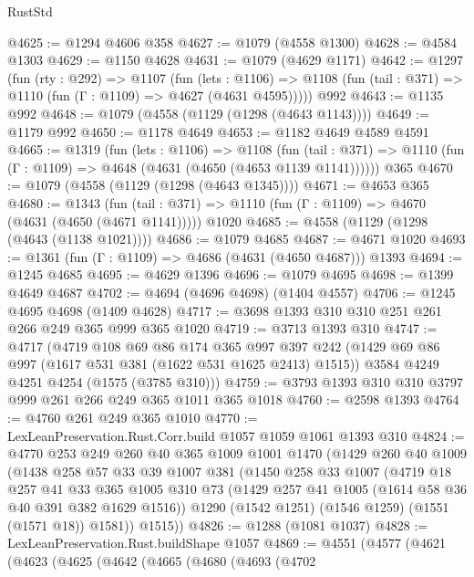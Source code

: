 \begin{lexlean}{RustStd}
\begin{coremodule}
@4625 := @1294 @4606 @358
@4627 := @1079 (@4558 @1300)
@4628 := @4584 @1303
@4629 := @1150 @4628
@4631 := @1079 (@4629 @1171)
@4642 := @1297
    (fun (rty : @292) =>
    @1107
      (fun (lets : @1106) =>
      @1108 (fun (tail : @371) => @1110 (fun (Γ : @1109) => @4627 (@4631 @4595)))))
    @992
@4643 := @1135 @992
@4648 := @1079 (@4558 (@1129 (@1298 (@4643 @1143))))
@4649 := @1179 @992
@4650 := @1178 @4649
@4653 := @1182 @4649 @4589 @4591
@4665 := @1319
    (fun (lets : @1106) =>
    @1108
      (fun (tail : @371) => @1110 (fun (Γ : @1109) => @4648 (@4631 (@4650 (@4653 @1139 @1141))))))
    @365
@4670 := @1079 (@4558 (@1129 (@1298 (@4643 @1345))))
@4671 := @4653 @365
@4680 := @1343
    (fun (tail : @371) => @1110 (fun (Γ : @1109) => @4670 (@4631 (@4650 (@4671 @1141)))))
    @1020
@4685 := @4558 (@1129 (@1298 (@4643 (@1138 @1021))))
@4686 := @1079 @4685
@4687 := @4671 @1020
@4693 := @1361 (fun (Γ : @1109) => @4686 (@4631 (@4650 @4687))) @1393
@4694 := @1245 @4685
@4695 := @4629 @1396
@4696 := @1079 @4695
@4698 := @1399 @4649 @4687
@4702 := @4694 (@4696 @4698) (@1404 @4557)
@4706 := @1245 @4695 @4698 (@1409 @4628)
@4717 := @3698 @1393 @310 @310 @251 @261 @266 @249 @365 @999 @365 @1020
@4719 := @3713 @1393 @310
@4747 := @4717
    (@4719
      @108
      @69
      @86
      @174
      @365
      @997
      @397
      @242
      (@1429 @69 @86 @997 (@1617 @531 @381 (@1622 @531 @1625 @2413) @1515))
      @3584
      @4249
      @4251
      @4254
      (@1575 (@3785 @310)))
@4759 := @3793 @1393 @310 @310 @3797 @999 @261 @266 @249 @365 @1011 @365 @1018
@4760 := @2598 @1393
@4764 := @4760 @261 @249 @365 @1010
@4770 := LexLeanPreservation.Rust.Corr.build @1057 @1059 @1061 @1393 @310
@4824 := @4770
    @253
    @249
    @260
    @40
    @365
    @1009
    @1001
    @1470
    (@1429
      @260
      @40
      @1009
      (@1438
        @258
        @57
        @33
        @39
        @1007
        @381
        (@1450
          @258
          @33
          @1007
          (@4719
            @18
            @257
            @41
            @33
            @365
            @1005
            @310
            @73
            (@1429 @257 @41 @1005 (@1614 @58 @36 @40 @391 @382 @1629 @1516))
            @1290
            (@1542 @1251)
            (@1546 @1259)
            (@1551 (@1571 @18))
            @1581))
        @1515))
@4826 := @1288 (@1081 @1037)
@4828 := LexLeanPreservation.Rust.buildShape @1057
@4869 := @4551
    (@4577
      (@4621
        (@4623
          (@4625
            (@4642
              (@4665
                (@4680
                  (@4693
                    (@4702

\end{coremodule}
\end{lexlean}
